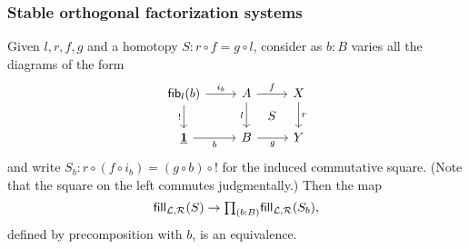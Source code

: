 \subsubsection{Stable orthogonal factorization systems}

\begin{lem}\label{lem:fill_compute}
Given $l,r,f,g$ and a homotopy $S : r \circ f = g  \circ l$, consider as $b:B$ varies all the diagrams of the form
\begin{equation*}
\begin{tikzcd}
\fib{l}{b} \arrow[r,"i_b"] \arrow[d,"!"'] & A \arrow[d,swap,"l"] \arrow[r,"f"] \ar[dr,phantom,"S"] & X \arrow[d,"r"] \\
\unit \arrow[r,swap,"b"] & B \arrow[r,swap,"g"] & Y
\end{tikzcd}
\end{equation*}
and write $S_b : r \circ (f \circ i_b) = (g\circ b) \circ \mathord !$ for the induced commutative square.
(Note that the square on the left commutes judgmentally.)
Then the map
\begin{equation*}
\fillers{S} \to \prd{b:B}\fillers{S_b},
\end{equation*}
defined by precomposition with $b$, is an equivalence.
\end{lem}

